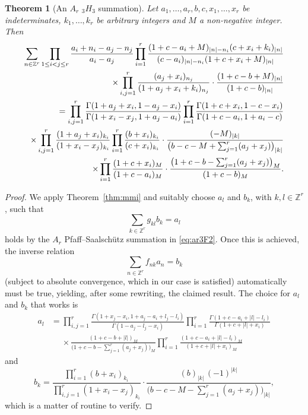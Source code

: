 \documentclass[reqno,12pt]{amsart}
\newtheorem{theorem}{Theorem}
\theoremstyle{remark}
\numberwithin{equation}{section}
\newcommand{\Ga}{\Gamma}
\newcommand{\Z}{\mathbb Z}
\begin{document}
\begin{theorem}[An $A_r$ ${}_3H_3$ summation]\label{thm:ar3H3}
Let $a_1,\ldots,a_r,b,c,x_1,\ldots,x_r$ be indeterminates,
$k_1,\ldots,k_r$ be arbitrary integers and $M$ a non-negative integer.
Then
\begin{align}\label{eq:ar3H3}
\sum_{n\in\Z^r}\prod_{1\le i< j\le r}\frac{a_i+n_i-a_j-n_j}{a_i-a_j}
\prod_{i=1}^r\frac{(1+c-a_i+M)_{|n|-n_i}(c+x_i+k_i)_{|n|}}
{(c-a_i)_{|n|-n_i}(1+c+x_i+M)_{|n|}}&\notag\\\times
\prod_{i,j=1}^r\frac{(a_j+x_i)_{n_j}}{(1+a_j+x_i+k_i)_{n_j}}\cdot
\frac{(1+c-b+M)_{|n|}}{(1+c-b)_{|n|}}&\notag\\
=\prod_{i,j=1}^r\frac{\Ga(1+a_j+x_i,1-a_j-x_i)}{\Ga(1+x_i-x_j,1+a_j-a_i)}
\prod_{i=1}^r\frac{\Ga(1+c+x_i,1-c-x_i)}{\Ga(1+c-a_i,1+a_i-c)}&\notag\\
\times\prod_{i,j=1}^r\frac{(1+a_j+x_i)_{k_i}}{(1+x_i-x_j)_{k_i}}
\prod_{i=1}^r\frac{(b+x_i)_{k_i}}{(c+x_i)_{k_i}}\cdot\frac{(-M)_{|k|}}
{\big(b-c-M+\sum_{j=1}^r(a_j+x_j)\big)_{|k|}}&\notag\\
\times\prod_{i=1}^r\frac{(1+c+x_i)_M}{(1+c-a_i)_M}\cdot
\frac{\big(1+c-b-\sum_{j=1}^r(a_j+x_j)\big)_M}{(1+c-b)_M}.
\end{align}
\end{theorem}
\begin{proof}
We apply Theorem~\ref{thm:mmi} and suitably choose $a_l$ and $b_k$,
with $k,l\in\Z^r$, such that
\begin{equation*}
\sum _{k\in\mathbb Z^r}g_{k l}b_{k}=a_{l}
\end{equation*}
holds by 
the $A_r$ Pfaff--Saalsch\"utz summation in \eqref{eq:ar3F2}.
Once this is achieved, the inverse relation
\begin{equation*}
\sum _{n\in\mathbb Z^r}f_{n k}a_{n}=b_{k}
\end{equation*}
(subject to absolute convergence, which in our case is satisfied)
automatically must be true, yielding, after some rewriting,
the claimed result.
The choice for $a_l$ and $b_k$ that works is
\begin{align*}
a_l&=\prod_{i,j=1}^r\frac{\Ga(1+x_j-x_i,1+a_j-a_i+l_j-l_i)}
{\Ga(1-a_j-l_j-x_i)}
\prod_{i=1}^r\frac{\Ga(1+c-a_i+|l|-l_i)}{\Ga(1+c+|l|+x_i)}\\
&\quad\;\times\frac{(1+c-b+|l|)_M}{\big(1+c-b-\sum_{j=1}^r(a_j+x_j)\big)_M}
\prod_{i=1}^r\frac{(1+c-a_i+|l|-l_i)_M}{(1+c+|l|+x_i)_M}
\end{align*}
and
$$
b_k=\frac{\prod_{i=1}^r(b+x_i)_{k_i}}{\prod_{i,j=1}^r(1+x_i-x_j)_{k_i}}
\cdot\frac{(b)_{|k|}\,(-1)^{|k|}}{\big(b-c-M-\sum_{j=1}^r(a_j+x_j)\big)_{|k|}},
$$
which is a matter of routine to verify.
\end{proof}
\end{document}
